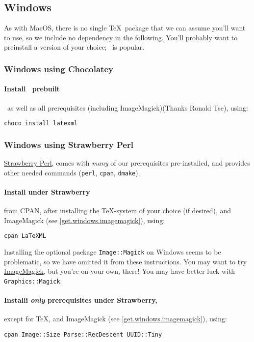 \documentclass{article}
\begin{document}
\subsection{Windows}\label{get.windows}
As with MacOS, there is no single \TeX\ package that we can assume
you'll want to use, so we include no dependency in the following.
You'll probably want to preinstall a version of your choice;
\MikTeX\ is popular.

\subsubsection{Windows using Chocolatey}\label{get.windows.chocolatey}
\paragraph*{Install \Chocolatey\ prebuilt} \LaTeXML\ as well as all prerequisites
(including ImageMagick)(Thanks Ronald Tse), using:
\begin{lstlisting}[style=shell]
choco install latexml
\end{lstlisting}

\subsubsection{Windows using Strawberry Perl}\label{get.windows.strawberry}
\href{https://strawberryperl.com}{Strawberry Perl},
comes with \emph{many} of our prerequisites pre-installed,
and provides other needed commands (\texttt{perl}, \texttt{cpan}, \texttt{dmake}).

\paragraph*{Install under Strawberry}\label{get.windows.strawberry} from CPAN,
after installing the \TeX-system of your choice (if desired),
and ImageMagick (see \ref{get.windows.imagemagick}),
using:
\begin{lstlisting}[style=shell]
cpan LaTeXML
\end{lstlisting}

Installing the optional package \texttt{Image::Magick} on Windows seems to be problematic,
so we have omitted it from these instructions.
You may want to try \href{https://www.imagemagick.org/}{ImageMagick}, but
you're on your own, there!  You may  have better luck with \texttt{Graphics::Magick}.

\paragraph*{Installi \emph{only} prerequisites  under Strawberry,}\label{get.windows.strawberry.prereq}
except for \TeX, and ImageMagick (see \ref{get.windows.imagemagick}),
using:
\begin{lstlisting}[style=shell]
cpan Image::Size Parse::RecDescent UUID::Tiny
\end{lstlisting}
\end{document}
